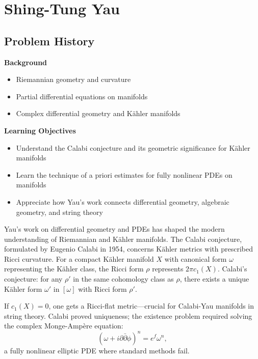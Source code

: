 \chapter{Shing-Tung Yau}

\section*{Problem History}

\begin{prereqs}
\noindent \textbf{Background}
\begin{itemize}
\item Riemannian geometry and curvature
\item Partial differential equations on manifolds
\item Complex differential geometry and Kähler manifolds
\end{itemize}
\end{prereqs}

\begin{objectives}
\noindent \textbf{Learning Objectives}
\begin{itemize}
\item Understand the Calabi conjecture and its geometric significance for Kähler manifolds
\item Learn the technique of a priori estimates for fully nonlinear PDEs on manifolds
\item Appreciate how Yau's work connects differential geometry, algebraic geometry, and string theory
\end{itemize}
\end{objectives}

Yau's work on differential geometry and PDEs has shaped the modern
understanding of Riemannian and K\"{a}hler manifolds. The Calabi
conjecture, formulated by Eugenio Calabi in 1954, concerns K\"{a}hler
metrics with prescribed Ricci curvature. For a compact K\"{a}hler
manifold $X$ with canonical form $\omega$ representing the K\"{a}hler
class, the Ricci form $\rho$ represents $2\pi c_1(X)$. Calabi's
conjecture: for any $\rho'$ in the same cohomology class as $\rho$, there
exists a unique K\"{a}hler form $\omega'$ in $[\omega]$ with Ricci form
$\rho'$.

If $c_1(X) = 0$, one gets a Ricci-flat metric---crucial for Calabi-Yau
manifolds in string theory. Calabi proved uniqueness; the existence
problem required solving the complex Monge-Amp\`{e}re equation:
\[
(\omega + i\partial\bar\partial \phi)^n = e^f \omega^n,
\]
a fully nonlinear elliptic PDE where standard methods fail.

